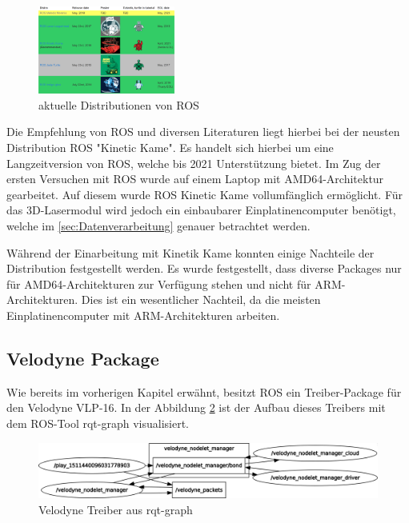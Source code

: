 \begin{figure}[H]
	\centering
	\includegraphics[width=0.4\textwidth]{resources/rosdistos.PNG}
	\caption[aktuelle Distributionen von ROS]{aktuelle Distributionen von ROS {\cite{ROSprojects}}}
	\label{fig:rosdistros}
\end{figure} 

Die Empfehlung von ROS und diversen Literaturen liegt hierbei bei der neusten Distribution ROS "Kinetic Kame". \cite{ROSprojects} Es handelt sich hierbei um eine Langzeitversion von ROS, welche bis 2021 Unterstützung bietet. Im Zug der ersten Versuchen mit ROS wurde auf einem Laptop mit AMD64-Architektur gearbeitet. Auf diesem wurde ROS Kinetic Kame vollumfänglich ermöglicht. Für das 3D-Lasermodul wird jedoch ein einbaubarer Einplatinencomputer benötigt, welche im \ref{sec:Datenverarbeitung} genauer betrachtet werden. 

Während der Einarbeitung mit Kinetik Kame konnten einige Nachteile der Distribution festgestellt werden. Es wurde festgestellt, dass diverse Packages nur für AMD64-Architekturen zur Verfügung stehen und nicht für ARM-Architekturen. Dies ist ein wesentlicher Nachteil, da die meisten Einplatinencomputer mit ARM-Architekturen arbeiten.

\subsection{Velodyne Package}
Wie bereits im vorherigen Kapitel erwähnt, besitzt ROS ein Treiber-Package für den Velodyne VLP-16. In der Abbildung \ref{fig:rosgraph} ist der Aufbau dieses Treibers mit dem ROS-Tool rqt-graph visualisiert. 

\begin{figure}[H]
	\centering
	\includegraphics[width=1\textwidth]{resources/rosgraph.png}
	\caption[Velodyne Treiber aus rqt-graph ]{Velodyne Treiber aus rqt-graph}
	\label{fig:rosgraph}
\end{figure} 

